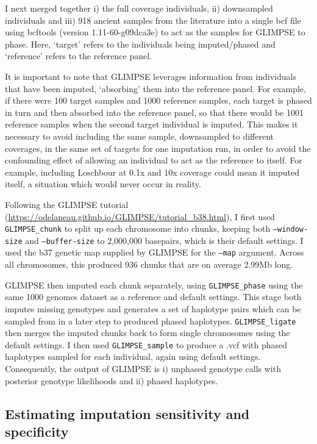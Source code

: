 I next merged together i) the full coverage individuals, ii) downsampled individuals and iii) 918 ancient samples from the literature into a single bcf file using bcftools (version 1.11-60-g09dca3e) \cite{li2011statistical} to act as the samples for GLIMPSE to phase. Here, `target' refers to the individuals being imputed/phased and `reference' refers to the reference panel.  

It is important to note that GLIMPSE leverages information from individuals that have been imputed, `absorbing' them into the reference panel. For example, if there were 100 target samples and 1000 reference samples, each target is phased in turn and then absorbed into the reference panel, so that there would be 1001 reference samples when the second target individual is imputed. This makes it necessary to avoid including the same sample, downsampled to different coverages, in the same set of targets for one imputation run, in order to avoid the confounding effect of allowing an individual to act as the reference to itself. For example, including Loschbour at 0.1x and 10x coverage could mean it imputed itself, a situation which would never occur in reality. 


Following the GLIMPSE tutorial (\url{https://odelaneau.github.io/GLIMPSE/tutorial_b38.html}), I first used \texttt{GLIMPSE\_chunk} to split up each  chromosome into chunks, keeping both \texttt{--window-size} and \texttt{--buffer-size} to 2,000,000 basepairs, which is their default settings. I used the b37 genetic map supplied by GLIMPSE for the \texttt{--map} argument. Across all chromosomes, this produced 936 chunks that are on average 2.99Mb long. 

GLIMPSE then imputed each chunk separately, using \texttt{GLIMPSE\_phase} using the same 1000 genomes dataset as a reference and default settings. This stage both imputes missing genotypes and generates a set of haplotype pairs which can be sampled from in a later step to produced phased haplotypes. \texttt{GLIMPSE\_ligate} then merges the imputed chunks back to form single chromosomes using the default settings. I then used \texttt{GLIMPSE\_sample} to produce a .vcf with phased haplotypes sampled for each individual, again using default settings. Consequently, the output of GLIMPSE is i) unphased genotype calls with posterior genotype likelihoods and ii) phased haplotypes.

\subsection{Estimating imputation sensitivity and specificity}

